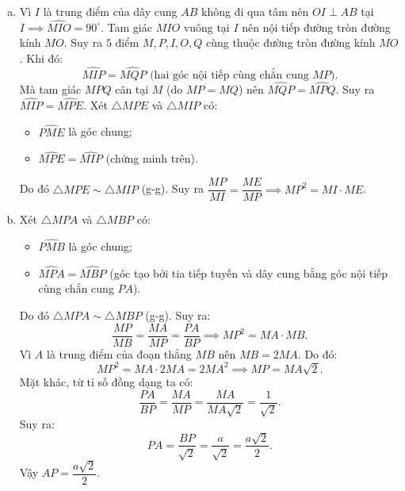 \begin{bt}
{\begin{enumerate}[a)]
	\item Vì $I$ là trung điểm của dây cung $AB$ không đi qua tâm nên $OI \perp AB$ tại $I \implies \widehat{MIO} = 90^\circ$.
	Tam giác $MIO$ vuông tại $I$ nên nội tiếp đường tròn đường kính $MO$.
	Suy ra $5$ điểm $M, P, I, O, Q$ cùng thuộc đường tròn đường kính $MO$.
	Khi đó:
	$$\widehat{MIP} = \widehat{MQP} \text{ (hai góc nội tiếp cùng chắn cung } MP\text{)}.$$
	Mà tam giác $MPQ$ cân tại $M$ (do $MP = MQ$) nên $\widehat{MQP} = \widehat{MPQ}$.
	Suy ra $\widehat{MIP} = \widehat{MPE}$.
	Xét $\triangle MPE$ và $\triangle MIP$ có:
	\begin{itemize}
		\item $\widehat{PME}$ là góc chung;
		\item $\widehat{MPE} = \widehat{MIP}$ (chứng minh trên).
	\end{itemize}
	Do đó $\triangle MPE \sim \triangle MIP$ (g-g).
	Suy ra $\dfrac{MP}{MI} = \dfrac{ME}{MP} \implies MP^2 = MI \cdot ME$.
	\item Xét $\triangle MPA$ và $\triangle MBP$ có:
	\begin{itemize}
		\item $\widehat{PMB}$ là góc chung;
		\item $\widehat{MPA} = \widehat{MBP}$ (góc tạo bởi tia tiếp tuyến và dây cung bằng góc nội tiếp cùng chắn cung $PA$).
	\end{itemize}
	Do đó $\triangle MPA \sim \triangle MBP$ (g-g).
	Suy ra:
	$$\dfrac{MP}{MB} = \dfrac{MA}{MP} = \dfrac{PA}{BP} \implies MP^2 = MA \cdot MB.$$
	Vì $A$ là trung điểm của đoạn thẳng $MB$ nên $MB = 2MA$.
	Do đó:
	$$MP^2 = MA \cdot 2MA = 2MA^2 \implies MP = MA\sqrt{2}.$$
	Mặt khác, từ tỉ số đồng dạng ta có:
	$$\dfrac{PA}{BP} = \dfrac{MA}{MP} = \dfrac{MA}{MA\sqrt{2}} = \dfrac{1}{\sqrt{2}}.$$
	Suy ra:
	$$PA = \dfrac{BP}{\sqrt{2}} = \dfrac{a}{\sqrt{2}} = \dfrac{a\sqrt{2}}{2}.$$
	Vậy $AP = \dfrac{a\sqrt{2}}{2}$.
\end{enumerate}
}
\end{bt}
